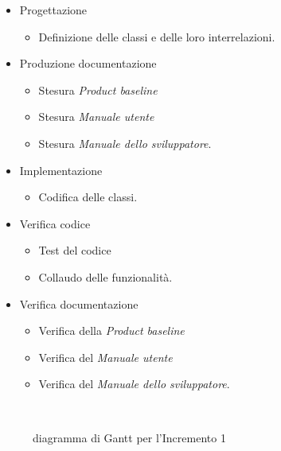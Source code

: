 \documentclass[../piano-di-progetto.tex]{subfiles}
\begin{document}
\begin{itemize}
  \item Progettazione
  \begin{itemize}
    \item Definizione delle classi e delle loro interrelazioni.
  \end{itemize}
  \item Produzione documentazione
  \begin{itemize}
    \item Stesura \textit{Product baseline}
    \item Stesura \textit{Manuale utente}
    \item Stesura \textit{Manuale dello sviluppatore}.
  \end{itemize}
  \item Implementazione
  \begin{itemize}
    \item Codifica delle classi.
  \end{itemize}
  \item Verifica codice
  \begin{itemize}
    \item Test del codice
    \item Collaudo delle funzionalità.
  \end{itemize}
  \item Verifica documentazione
  \begin{itemize}
    \item Verifica della \textit{Product baseline}
    \item Verifica del \textit{Manuale utente}
    \item Verifica del \textit{Manuale dello sviluppatore}.
  \end{itemize}
\end{itemize}
\begin{figure}[H]
  \centering
  
  \caption{diagramma di Gantt per l'Incremento 1}%
~~\label{fig:gantt_incremento_1}
\end{figure}
\end{document}
